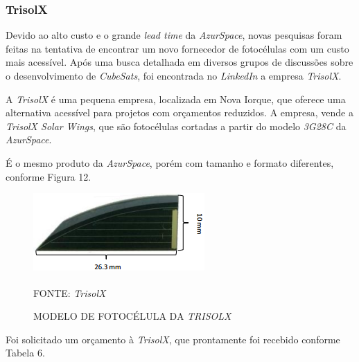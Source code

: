 \documentclass[
	12pt,				%
	openright,			%
	oneside,			%
	a4paper,			%
	english,			%
	french,				%
	spanish,			%
	brazil,				%
	oldfontcommands
	]{abntex2}
\begin{document}
\subsubsection[TrisolX]{TrisolX}	
	
	Devido ao alto custo e o grande \textit{lead time} da \textit{AzurSpace}, novas pesquisas foram feitas na tentativa de encontrar um novo fornecedor de fotocélulas com um custo mais acessível. Após uma busca detalhada em diversos grupos de discussões sobre o desenvolvimento de \textit{CubeSats}, foi encontrada no \textit{LinkedIn} a empresa \textit{TrisolX}.
	
	A \textit{TrisolX} é uma pequena empresa, localizada em Nova Iorque, que oferece uma alternativa acessível para projetos com orçamentos reduzidos. A empresa, vende a \textit{TrisolX Solar Wings}, que são fotocélulas cortadas a partir do modelo \textit{3G28C} da \textit{AzurSpace}.
	
	É o mesmo produto da \textit{AzurSpace}, porém com tamanho e formato diferentes, conforme Figura 12.
	
	\begin{figure}[th]
		\caption{MODELO DE FOTOCÉLULA DA \textit{TRISOLX}}
		\centering
		\includegraphics[width=0.5\linewidth]{./figs/TrisolX}
			
		\begin{small}
			FONTE: \textit{TrisolX}\textsuperscript{\cite{TrisolX}}
		\end{small}		
	\end{figure}	

	Foi solicitado um orçamento à \textit{TrisolX}, que prontamente foi recebido conforme Tabela 6.
	
\end{document}
